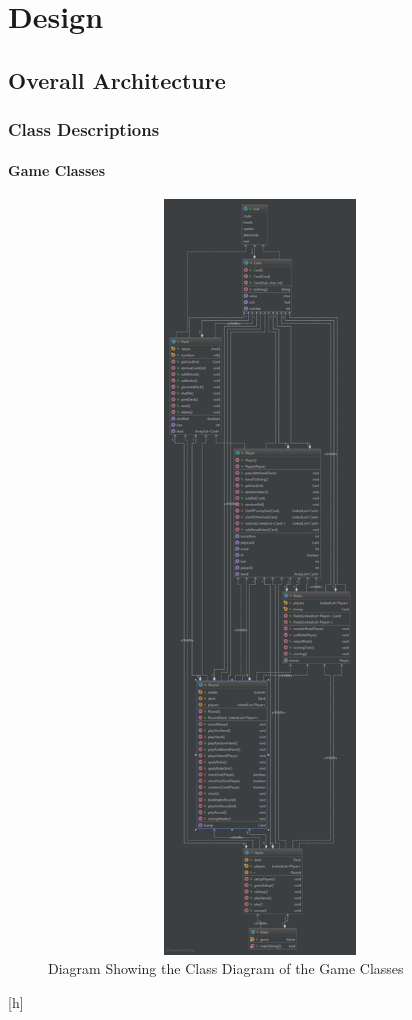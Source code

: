\chapter{Design}

\section{Overall Architecture}

\subsection{Class Descriptions}
\subsubsection{Game Classes}
\begin{figure}[h]
\centering
\includegraphics[width=15cm ,height=20cm,keepaspectratio]{Game_Classes}
\caption{Diagram Showing the Class Diagram of the Game Classes}
\end{figure}[h]

